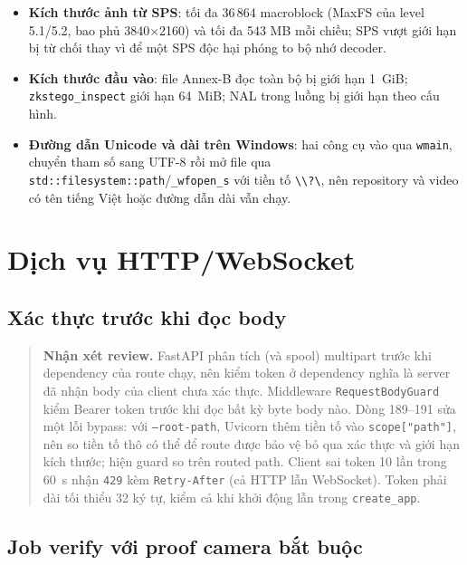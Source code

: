 \documentclass[10pt,a4paper]{article}
\newcommand{\srcpy}[3]{}
\newcommand{\review}[1]{\begin{quote}\colorbox{ReviewBg}{\parbox{0.94\linewidth}{\textbf{Nhận xét review.} #1}}\end{quote}}
\begin{document}
\begin{itemize}
  \item \textbf{Kích thước ảnh từ SPS}: tối đa 36\,864 macroblock (MaxFS của level 5.1/5.2, bao phủ 3840$\times$2160) và tối đa 543 MB mỗi chiều; SPS vượt giới hạn bị từ chối thay vì để một SPS độc hại phóng to bộ nhớ decoder.
  \item \textbf{Kích thước đầu vào}: file Annex-B đọc toàn bộ bị giới hạn 1~GiB; \texttt{zkstego\_inspect} giới hạn 64~MiB; NAL trong luồng bị giới hạn theo cấu hình.
  \item \textbf{Đường dẫn Unicode và dài trên Windows}: hai công cụ vào qua \texttt{wmain}, chuyển tham số sang UTF-8 rồi mở file qua \texttt{std::filesystem::path}/\texttt{\_wfopen\_s} với tiền tố \texttt{\textbackslash\textbackslash?\textbackslash}, nên repository và video có tên tiếng Việt hoặc đường dẫn dài vẫn chạy.
\end{itemize}

\section{Dịch vụ HTTP/WebSocket}

\subsection{Xác thực trước khi đọc body}

\srcpy{src/api/app.py}{181}{224}

\review{FastAPI phân tích (và spool) multipart trước khi dependency của route chạy, nên kiểm token ở dependency nghĩa là server đã nhận body của client chưa xác thực. Middleware \texttt{RequestBodyGuard} kiểm Bearer token trước khi đọc bất kỳ byte body nào. Dòng 189--191 sửa một lỗi bypass: với \texttt{--root-path}, Uvicorn thêm tiền tố vào \texttt{scope["path"]}, nên so tiền tố thô có thể để route được bảo vệ bỏ qua xác thực và giới hạn kích thước; hiện guard so trên routed path. Client sai token 10 lần trong 60~s nhận \texttt{429} kèm \texttt{Retry-After} (cả HTTP lẫn WebSocket). Token phải dài tối thiểu 32 ký tự, kiểm cả khi khởi động lẫn trong \texttt{create\_app}.}

\subsection{Job verify với proof camera bắt buộc}

\srcpy{src/api/native_handlers.py}{56}{88}

\srcpy{src/api/native_handlers.py}{198}{208}
\end{document}
